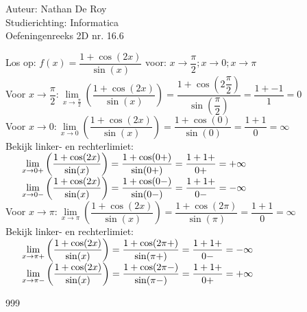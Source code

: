 \documentclass[a4paper]{article}
\begin{document}
  
\noindent \large Auteur: Nathan De Roy \\
\noindent \large Studierichting: Informatica\\
\noindent \large Oefeningenreeks 2D nr. 16.6\\

\medskip

\normalsize

Los op: $f(x) = \dfrac{1 + \cos(2x)}{\sin(x)}$ voor: $x \to \dfrac{\pi}{2}; x \to 0; x \to \pi$\\

Voor $x \to \dfrac{\pi}{2}: \lim\limits_{x \to \tfrac{\pi}{2}}\left(\dfrac{1 + \cos(2x)}{\sin(x)}\right) = \dfrac{1 + \cos(2\dfrac{\pi}{2})}{\sin(\dfrac{\pi}{2})} = \dfrac{1 + -1}{1} = 0$\\


Voor $x \to 0: \lim\limits_{x \to 0}\left(\dfrac{1 + \cos(2x)}{\sin(x)}\right) = \dfrac{1 + \cos(0)}{\sin(0)} = \dfrac{1 + 1}{0} = \infty$\\

Bekijk linker- en rechterlimiet:\\

$\indent \lim\limits_{x \to 0+}\left(\dfrac{1 + \cos(2x)}{\sin(x)}\right) = \dfrac{1 + \cos(0+)}{\sin(0+)} = \dfrac{1 + 1+}{0+} = +\infty$\\

$\indent \lim\limits_{x \to 0-}\left(\dfrac{1 + \cos(2x)}{\sin(x)}\right) = \dfrac{1 + \cos(0-)}{\sin(0-)} = \dfrac{1 + 1+}{0-} = -\infty$\\

Voor $x \to \pi: \lim\limits_{x \to \pi}\left(\dfrac{1 + \cos(2x)}{\sin(x)}\right) = \dfrac{1 + \cos(2\pi)}{\sin(\pi)} = \dfrac{1 + 1}{0} = \infty$\\

Bekijk linker- en rechterlimiet:\\

$\indent \lim\limits_{x \to \pi+}\left(\dfrac{1 + \cos(2x)}{\sin(x)}\right) = \dfrac{1 + \cos(2\pi+)}{\sin(\pi+)} = \dfrac{1 + 1+}{0-} = -\infty$\\

$\indent \lim\limits_{x \to \pi-}\left(\dfrac{1 + \cos(2x)}{\sin(x)}\right) = \dfrac{1 + \cos(2\pi-)}{\sin(\pi-)} = \dfrac{1 + 1+}{0+} = +\infty$\\

\begin{thebibliography}{999}
\end{thebibliography}
\end{document}
